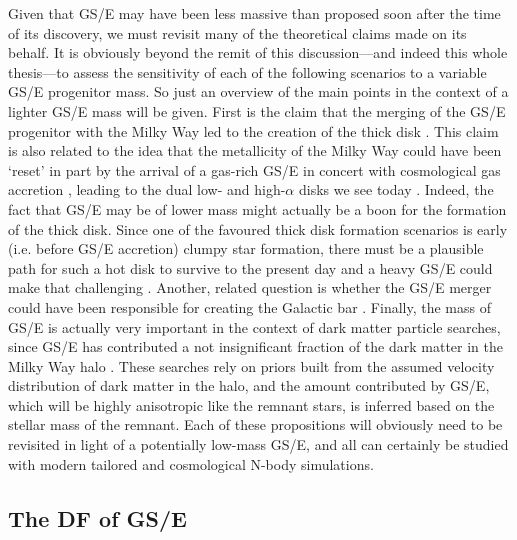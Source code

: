Given that GS/E may have been less massive than proposed soon after the time of its discovery, we must revisit many of the theoretical claims made on its behalf. It is obviously beyond the remit of this discussion---and indeed this whole thesis---to assess the sensitivity of each of the following scenarios to a variable GS/E progenitor mass. So just an overview of the main points in the context of a lighter GS/E mass will be given. First is the claim that the merging of the GS/E progenitor with the Milky Way led to the creation of the thick disk \parencite[e.g.][]{helmi18,gallart19}. This claim is also related to the idea that the metallicity of the Milky Way could have been `reset' in part by the arrival of a gas-rich GS/E in concert with cosmological gas accretion \parencite[e.g.][]{grand20,renaud21,ciuca24}, leading to the dual low- and high-$\alpha$ disks we see today \parencite[see also the two-infall model of e.g.][]{chiappini97}. Indeed, the fact that GS/E may be of lower mass might actually be a boon for the formation of the thick disk. Since one of the favoured thick disk formation scenarios is early (i.e. before GS/E accretion) clumpy star formation, there must be a plausible path for such a hot disk to survive to the present day and a heavy GS/E could make that challenging \parencite[see e.g. arguments for this in][]{deason24}. Another, related question is whether the GS/E merger could have been responsible for creating the Galactic bar \parencite{merrow23}. Finally, the mass of GS/E is actually very important in the context of dark matter particle searches, since GS/E has contributed a not insignificant fraction of the dark matter in the Milky Way halo \parencite{necib19,evans19}. These searches rely on priors built from the assumed velocity distribution of dark matter in the halo, and the amount contributed by GS/E, which will be highly anisotropic like the remnant stars, is inferred based on the stellar mass of the remnant. Each of these propositions will obviously need to be revisited in light of a potentially low-mass GS/E, and all can certainly be studied with modern tailored and cosmological N-body simulations. 

\subsection{The DF of GS/E}

